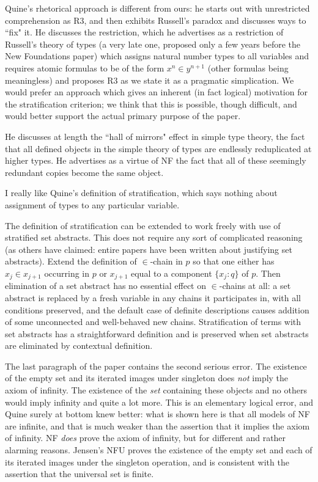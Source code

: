 \documentclass[12pt]{article}
\begin{document}
Quine's rhetorical approach is different from ours:  he starts out with unrestricted comprehension as R3, and then exhibits Russell's paradox and discusses ways to ``fix" it.  He discusses the restriction, which he advertises as a restriction of Russell's theory of types (a very late one, proposed only a few years before the New Foundations paper)  which assigns natural number types to all variables and requires atomic formulas to be of the form $x^n \in y^{n+1}$ (other formulas being meaningless) and proposes R3 as we state it as a pragmatic simplication.  We would prefer an approach which gives an inherent (in fact logical) motivation for the stratification criterion;  we think that this is possible, though difficult, and would better support the actual primary purpose of the paper.

He discusses at length the ``hall of mirrors" effect in simple type theory, the fact that all defined objects in the simple theory of types are endlessly reduplicated at higher types.  He advertises as a virtue of NF the fact that all of these seemingly redundant copies become the same object.

I really like Quine's definition of stratification, which says nothing about assignment of types to any particular variable.

The definition of stratification can be extended to work freely with use of stratified set abstracts.  This does not require any sort of complicated reasoning (as others have claimed:  entire papers have been written about justifying set abstracts).   Extend the definition of $\in$-chain in $p$ so that one either has $x_j \in x_{j+1}$ occurring in $p$ or $x_{j+1}$ equal to a component $\{x_j:q\}$ of $p$.  Then elimination of a set abstract has no essential effect on $\in$-chains at all:  a set abstract is replaced by a fresh variable in any chains it participates in, with all conditions preserved, and the default case of definite descriptions causes addition of some unconnected and well-behaved new chains.  Stratification of terms with set abstracts has a straightforward definition and is preserved when set abstracts are eliminated by contextual definition.

The last paragraph of the paper contains the second serious error.  The existence of the empty set and its iterated images under singleton does {\em not\/} imply the axiom of infinity.  The existence of the {\em set\/} containing these objects and no others would imply infinity and quite a lot more.  This is an elementary logical error, and Quine surely at bottom knew better:  what is shown here is that all models of NF are infinite, and that is much weaker than the assertion that it implies the axiom of infinity.  NF {\em does\/} prove the axiom of infinity, but for different and rather alarming reasons.  Jensen's NFU proves the existence of the empty set and each of its iterated images under the singleton operation, and is consistent with the assertion that the universal set is finite.
\end{document}
